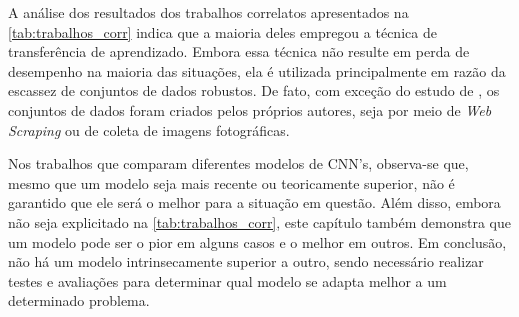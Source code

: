 A análise dos resultados dos trabalhos correlatos apresentados na \autoref{tab:trabalhos_corr} indica que a maioria deles empregou a técnica de transferência de aprendizado. Embora essa técnica não resulte em perda de desempenho na maioria das situações, ela é utilizada principalmente em razão da escassez de conjuntos de dados robustos. De fato, com exceção do estudo de , os conjuntos de dados foram criados pelos próprios autores, seja por meio de \textit{Web Scraping} ou de coleta de imagens fotográficas.

Nos trabalhos que comparam diferentes modelos de CNN's, observa-se que, mesmo que um modelo seja mais recente ou teoricamente superior, não é garantido que ele será o melhor para a situação em questão. 
Além disso, embora não seja explicitado na \autoref{tab:trabalhos_corr}, este capítulo também demonstra que um modelo pode ser o pior em alguns casos e o melhor em outros. 
Em conclusão, não há um modelo intrinsecamente superior a outro, sendo necessário realizar testes e avaliações para determinar qual modelo se adapta melhor a um determinado problema.
